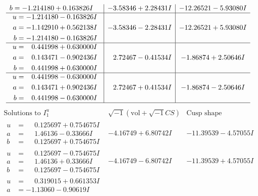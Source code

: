 \documentclass[1p]{elsarticle_modified}
\theoremstyle{definition}
\newcommand{\I}{\sqrt{-1}}
\begin{document}
$$\begin{array}{c|c|c}
\begin{aligned}
b &= -1.214180 + 0.163826 I\end{aligned}
 & -3.58346 + 2.28431 I & -12.26521 - 5.93080 I \\ \hline\begin{aligned}
u &= -1.214180 - 0.163826 I \\
a &= -1.142910 + 0.562138 I \\
b &= -1.214180 - 0.163826 I\end{aligned}
 & -3.58346 - 2.28431 I & -12.26521 + 5.93080 I \\ \hline\begin{aligned}
u &= \phantom{-}0.441998 + 0.630000 I \\
a &= \phantom{-}0.143471 - 0.902436 I \\
b &= \phantom{-}0.441998 + 0.630000 I\end{aligned}
 & \phantom{-}2.72467 - 0.41534 I & -1.86874 + 2.50646 I \\ \hline\begin{aligned}
u &= \phantom{-}0.441998 - 0.630000 I \\
a &= \phantom{-}0.143471 + 0.902436 I \\
b &= \phantom{-}0.441998 - 0.630000 I\end{aligned}
 & \phantom{-}2.72467 + 0.41534 I & -1.86874 - 2.50646 I\\
 \hline 
 \end{array}$$\newpage$$\begin{array}{c|c|c}  
\text{Solutions to }I^u_{1}& \I (\text{vol} + \sqrt{-1}CS) & \text{Cusp shape}\\
 \hline 
\begin{aligned}
u &= \phantom{-}0.125697 + 0.754675 I \\
a &= \phantom{-}1.46136 - 0.33666 I \\
b &= \phantom{-}0.125697 + 0.754675 I\end{aligned}
 & -4.16749 + 6.80742 I & -11.39539 - 4.57055 I \\ \hline\begin{aligned}
u &= \phantom{-}0.125697 - 0.754675 I \\
a &= \phantom{-}1.46136 + 0.33666 I \\
b &= \phantom{-}0.125697 - 0.754675 I\end{aligned}
 & -4.16749 - 6.80742 I & -11.39539 + 4.57055 I \\ \hline\begin{aligned}
u &= \phantom{-}0.319015 + 0.661353 I \\
a &= -1.13060 - 0.90619 I \\

\end{aligned}
\end{array}$$
\end{document}
